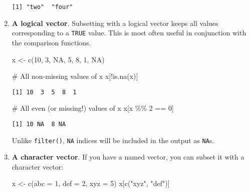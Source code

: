 \documentclass[
  letterpaper,
  DIV=11,
  numbers=noendperiod]{scrreprt}
\newenvironment{Shaded}{\begin{snugshade}}{\end{snugshade}}
\newcommand{\AttributeTok}[1]{\textcolor[rgb]{0.40,0.45,0.13}{#1}}
\newcommand{\CommentTok}[1]{\textcolor[rgb]{0.37,0.37,0.37}{#1}}
\newcommand{\ConstantTok}[1]{\textcolor[rgb]{0.56,0.35,0.01}{#1}}
\newcommand{\DecValTok}[1]{\textcolor[rgb]{0.68,0.00,0.00}{#1}}
\newcommand{\FunctionTok}[1]{\textcolor[rgb]{0.28,0.35,0.67}{#1}}
\newcommand{\NormalTok}[1]{\textcolor[rgb]{0.00,0.23,0.31}{#1}}
\newcommand{\OtherTok}[1]{\textcolor[rgb]{0.00,0.23,0.31}{#1}}
\newcommand{\SpecialCharTok}[1]{\textcolor[rgb]{0.37,0.37,0.37}{#1}}
\newcommand{\StringTok}[1]{\textcolor[rgb]{0.13,0.47,0.30}{#1}}
\begin{document}
\begin{enumerate}
\begin{verbatim}
[1] "two"  "four"
\end{verbatim}
\item
  \textbf{A logical vector}. Subsetting with a logical vector keeps all
  values corresponding to a \texttt{TRUE} value. This is most often
  useful in conjunction with the comparison functions.

\begin{Shaded}
\begin{Highlighting}[]
\NormalTok{x }\OtherTok{\textless{}{-}} \FunctionTok{c}\NormalTok{(}\DecValTok{10}\NormalTok{, }\DecValTok{3}\NormalTok{, }\ConstantTok{NA}\NormalTok{, }\DecValTok{5}\NormalTok{, }\DecValTok{8}\NormalTok{, }\DecValTok{1}\NormalTok{, }\ConstantTok{NA}\NormalTok{)}

\CommentTok{\# All non{-}missing values of x}
\NormalTok{x[}\SpecialCharTok{!}\FunctionTok{is.na}\NormalTok{(x)]}
\end{Highlighting}
\end{Shaded}

\begin{verbatim}
[1] 10  3  5  8  1
\end{verbatim}

\begin{Shaded}
\begin{Highlighting}[]
\CommentTok{\# All even (or missing!) values of x}
\NormalTok{x[x }\SpecialCharTok{\%\%} \DecValTok{2} \SpecialCharTok{==} \DecValTok{0}\NormalTok{]}
\end{Highlighting}
\end{Shaded}

\begin{verbatim}
[1] 10 NA  8 NA
\end{verbatim}

  Unlike \texttt{filter()}, \texttt{NA} indices will be included in the
  output as \texttt{NA}s.
\item
  \textbf{A character vector}. If you have a named vector, you can
  subset it with a character vector:

\begin{Shaded}
\begin{Highlighting}[]
\NormalTok{x }\OtherTok{\textless{}{-}} \FunctionTok{c}\NormalTok{(}\AttributeTok{abc =} \DecValTok{1}\NormalTok{, }\AttributeTok{def =} \DecValTok{2}\NormalTok{, }\AttributeTok{xyz =} \DecValTok{5}\NormalTok{)}
\NormalTok{x[}\FunctionTok{c}\NormalTok{(}\StringTok{"xyz"}\NormalTok{, }\StringTok{"def"}\NormalTok{)]}
\end{Highlighting}
\end{Shaded}


\end{enumerate}
\end{document}
